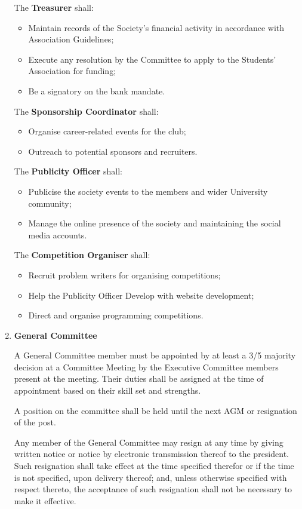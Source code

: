 \documentclass[11pt]{article}
\begin{document}
\begin{enumerate}[label = \Roman*.]
The \textbf{Treasurer} shall:
\begin{itemize}
\item Maintain records of the Society's financial activity in accordance with Association Guidelines;
\item Execute any resolution by the Committee to apply to the Students' Association for funding;
\item Be a signatory on the bank mandate.
\end{itemize}

The \textbf{Sponsorship Coordinator} shall:
\begin{itemize}
\item Organise career-related events for the club;
\item Outreach to potential sponsors and recruiters.
\end{itemize}

The \textbf{Publicity Officer} shall:
\begin{itemize}
\item Publicise the society events to the members and wider University community;
\item Manage the online presence of the society and maintaining the social media accounts.
\end{itemize}

The \textbf{Competition Organiser} shall:
\begin{itemize}
\item Recruit problem writers for organising competitions;
\item Help the Publicity Officer Develop with website development;
\item Direct and organise programming competitions.
\end{itemize}

\item \textbf{General Committee}

A General Committee member must be appointed by at least a 3/5 majority decision at a Committee Meeting by the Executive Committee members present at the meeting. Their duties shall be assigned at the time of appointment based on their skill set and strengths. 

A position on the committee shall be held until the next AGM or resignation of the post. 

Any member of the General Committee may resign at any time by giving written notice or notice by electronic transmission thereof to the president. Such resignation shall take effect at the time specified therefor or if the time is not specified, upon delivery thereof; and, unless otherwise specified with respect thereto, the acceptance of such resignation shall not be necessary to make it effective.


\end{enumerate}
\end{document}
